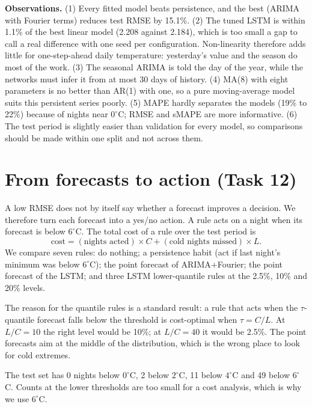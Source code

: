 \documentclass[11pt,a4paper]{article}
\begin{document}
\textbf{Observations.} (1) Every fitted model beats persistence, and the best (ARIMA with Fourier terms) reduces test RMSE by 15.1\%. (2) The tuned LSTM is within 1.1\% of the best linear model (2.208 against 2.184), which is too small a gap to call a real difference with one seed per configuration. Non-linearity therefore adds little for one-step-ahead daily temperature: yesterday's value and the season do most of the work. (3) The seasonal ARIMA is told the day of the year, while the networks must infer it from at most 30 days of history. (4) MA(8) with eight parameters is no better than AR(1) with one, so a pure moving-average model suits this persistent series poorly. (5) MAPE hardly separates the models (19\% to 22\%) because of nights near $0^\circ$C; RMSE and sMAPE are more informative. (6) The test period is slightly easier than validation for every model, so comparisons should be made within one split and not across them.

\section{From forecasts to action (Task 12)}\label{sec:action}
A low RMSE does not by itself say whether a forecast improves a decision. We therefore turn each forecast into a yes/no action. A rule acts on a night when its forecast is below $6^\circ$C. The total cost of a rule over the test period is
\[
\text{cost} = (\text{nights acted})\times C + (\text{cold nights missed})\times L .
\]
We compare seven rules: do nothing; a persistence habit (act if last night's minimum was below $6^\circ$C); the point forecast of ARIMA+Fourier; the point forecast of the LSTM; and three LSTM lower-quantile rules at the 2.5\%, 10\% and 20\% levels.

The reason for the quantile rules is a standard result: a rule that acts when the $\tau$-quantile forecast falls below the threshold is cost-optimal when $\tau = C/L$. At $L/C=10$ the right level would be 10\%; at $L/C=40$ it would be 2.5\%. The point forecasts aim at the middle of the distribution, which is the wrong place to look for cold extremes.

The test set has 0 nights below $0^\circ$C, 2 below $2^\circ$C, 11 below $4^\circ$C and 49 below $6^\circ$C. Counts at the lower thresholds are too small for a cost analysis, which is why we use $6^\circ$C.
\end{document}
